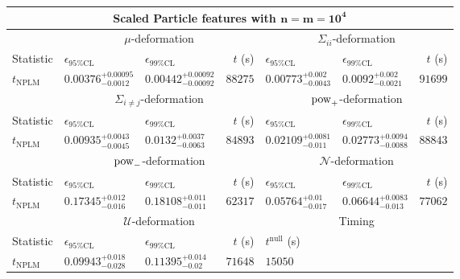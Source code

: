 \begin{tabular}{l|llr|llr}
	\toprule
	\multicolumn{7}{c}{{\bf Scaled Particle features with $\mathbf{n=m=10^{4}}$}} \\
	\toprule
	\multicolumn{1}{c}{} & \multicolumn{3}{c}{$\mu$-deformation} & \multicolumn{3}{c}{$\Sigma_{ii}$-deformation} \\
	Statistic & $\epsilon_{95\%\mathrm{CL}}$ & $\epsilon_{99\%\mathrm{CL}}$ & $t$ (s) & $\epsilon_{95\%\mathrm{CL}}$ & $\epsilon_{99\%\mathrm{CL}}$ & $t$ (s) \\
	\midrule
	$t_{\mathrm{NPLM}}$ & $0.00376_{-0.0012}^{+0.00095}$ & $0.00442_{-0.00092}^{+0.00092}$ & $88275$ & $0.00773_{-0.0043}^{+0.002}$ & $0.0092_{-0.0021}^{+0.002}$ & $91699$ \\
	\toprule
	\multicolumn{1}{c}{} & \multicolumn{3}{c}{$\Sigma_{i\neq j}$-deformation} & \multicolumn{3}{c}{$\rm{pow}_{+}$-deformation} \\
	Statistic & $\epsilon_{95\%\mathrm{CL}}$ & $\epsilon_{99\%\mathrm{CL}}$ & $t$ (s) & $\epsilon_{95\%\mathrm{CL}}$ & $\epsilon_{99\%\mathrm{CL}}$ & $t$ (s) \\
	\midrule
	$t_{\mathrm{NPLM}}$ & $0.00935_{-0.0045}^{+0.0043}$ & $0.0132_{-0.0063}^{+0.0037}$ & $84893$ & $0.02109_{-0.011}^{+0.0081}$ & $0.02773_{-0.0088}^{+0.0094}$ & $88843$ \\
	\toprule
	\multicolumn{1}{c}{} & \multicolumn{3}{c}{$\rm{pow}_{-}$-deformation} & \multicolumn{3}{c}{$\mathcal{N}$-deformation} \\
	Statistic & $\epsilon_{95\%\mathrm{CL}}$ & $\epsilon_{99\%\mathrm{CL}}$ & $t$ (s) & $\epsilon_{95\%\mathrm{CL}}$ & $\epsilon_{99\%\mathrm{CL}}$ & $t$ (s) \\
	\midrule
	$t_{\mathrm{NPLM}}$ & $0.17345_{-0.016}^{+0.012}$ & $0.18108_{-0.011}^{+0.011}$ & $62317$ & $0.05764_{-0.017}^{+0.01}$ & $0.06644_{-0.013}^{+0.0083}$ & $77062$ \\
	\toprule
	\multicolumn{1}{c}{} & \multicolumn{3}{c}{$\mathcal{U}$-deformation} & \multicolumn{3}{c}{Timing} \\
	Statistic & $\epsilon_{95\%\mathrm{CL}}$ & $\epsilon_{99\%\mathrm{CL}}$ & $t$ (s) & $t^{\mathrm{null}}$ (s) \\
	\midrule
	$t_{\mathrm{NPLM}}$ & $0.09943_{-0.028}^{+0.018}$ & $0.11395_{-0.02}^{+0.014}$ & $71648$ & $15050$ \\
	\bottomrule
\end{tabular}